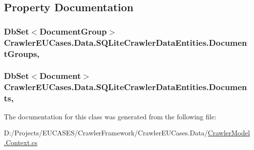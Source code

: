 \subsection{Property Documentation}
\hypertarget{class_crawler_e_u_cases_1_1_data_1_1_s_q_lite_crawler_data_entities_a3d0619ce86db6ff97e062247ee9fbbb7}{
\subsubsection[{Document\-Groups}]{\setlength{\rightskip}{0pt plus 5cm}Db\-Set$<${\bf Document\-Group}$>$ Crawler\-E\-U\-Cases.\-Data.\-S\-Q\-Lite\-Crawler\-Data\-Entities.\-Document\-Groups\hspace{0.3cm}{\ttfamily [get]}, {\ttfamily [set]}}}\label{class_crawler_e_u_cases_1_1_data_1_1_s_q_lite_crawler_data_entities_a3d0619ce86db6ff97e062247ee9fbbb7}
\hypertarget{class_crawler_e_u_cases_1_1_data_1_1_s_q_lite_crawler_data_entities_aec7094a9f50c2562161bcafc8b9946ac}{
\subsubsection[{Documents}]{\setlength{\rightskip}{0pt plus 5cm}Db\-Set$<${\bf Document}$>$ Crawler\-E\-U\-Cases.\-Data.\-S\-Q\-Lite\-Crawler\-Data\-Entities.\-Documents\hspace{0.3cm}{\ttfamily [get]}, {\ttfamily [set]}}}\label{class_crawler_e_u_cases_1_1_data_1_1_s_q_lite_crawler_data_entities_aec7094a9f50c2562161bcafc8b9946ac}


The documentation for this class was generated from the following file\-:\begin{DoxyCompactItemize}
\item 
D\-:/\-Projects/\-E\-U\-C\-A\-S\-E\-S/\-Crawler\-Framework/\-Crawler\-E\-U\-Cases.\-Data/\hyperlink{_crawler_model_8_context_8cs}{Crawler\-Model.\-Context.\-cs}\end{DoxyCompactItemize}
